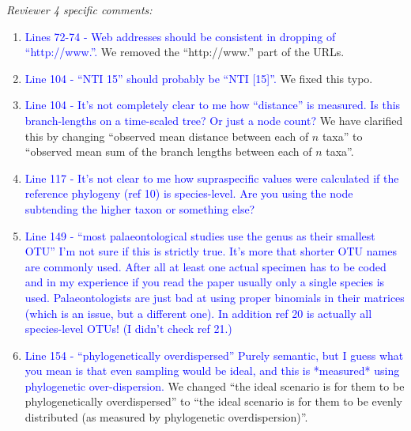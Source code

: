 \documentclass[12pt,letterpaper]{article}
\renewcommand{\subsection}[1]{%
\bigskip
\begin{center}
\begin{large}
\normalfont\itshape #1
\end{large}
\end{center}}
\begin{document}
\subsection{Reviewer 4 specific comments:}
\begin{enumerate}
\item{\textcolor{blue}{Lines 72-74 - Web addresses should be consistent in dropping of ``http://www.''.}}
We removed the ``http://www.'' part of the URLs.

\item{\textcolor{blue}{Line 104 - ``NTI 15'' should probably be ``NTI [15]''.}}
We fixed this typo.

\item{\textcolor{blue}{Line 104 - It's not completely clear to me how ``distance'' is measured. Is this branch-lengths on a time-scaled tree? Or just a node count?}}
We have clarified this by changing ``observed mean distance between each of $n$ taxa'' to ``observed mean sum of the branch lengths between each of $n$ taxa''. %

\item{\textcolor{blue}{Line 117 - It's not clear to me how supraspecific values were calculated if the reference phylogeny (ref 10) is species-level. Are you using the node subtending the higher taxon or something else?}}

\item{\textcolor{blue}{Line 149 - ``most palaeontological studies use the genus as their smallest OTU'' I'm not sure if this is strictly true. It's more that shorter OTU names are commonly used. After all at least one actual specimen has to be coded and in my experience if you read the paper usually only a single species is used. Palaeontologists are just bad at using proper binomials in their matrices (which is an issue, but a different one). In addition ref 20 is actually all species-level OTUs! (I didn't check ref 21.)}}

\item{\textcolor{blue}{Line 154 - ``phylogenetically overdispersed'' Purely semantic, but I guess what you mean is that even sampling would be ideal, and this is *measured* using phylogenetic over-dispersion.}}
We changed ``the ideal scenario is for them to be phylogenetically overdispersed'' to ``the ideal scenario is for them to be evenly distributed (as measured by phylogenetic overdispersion)''.


\end{enumerate}
\end{document}
